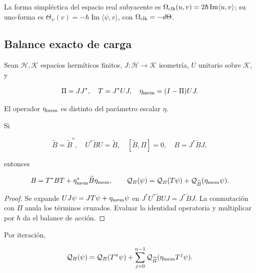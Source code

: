 La forma simpléctica del espacio real subyacente es
\(\Omega_{\rm clk}(u,v)=2\hbar\operatorname{Im}\langle u,v\rangle\);
su uno-forma es
\(\Theta_\psi(v)=-\hbar\operatorname{Im}\langle\psi,v\rangle\),
con \(\Omega_{\rm clk}=-d\Theta\).

\subsection{Balance exacto de carga}

Sean \(\mathcal H,\mathcal K\) espacios hermíticos finitos, \(J:\mathcal H\to\mathcal K\) isometría, \(U\) unitario sobre \(\mathcal K\), y

\begin{equation}
\Pi=JJ^*,\quad T=J^*UJ,\quad
\eta_{\rm mem}=(I-\Pi)UJ.
\label{x_reciprocidad:nuc07:eq:15}
\end{equation}

El operador \(\eta_{\rm mem}\) es distinto del parámetro escalar \(\eta\).

\begin{proposition}
Si

\begin{equation}
\widetilde B=\widetilde B^*,\quad U^*\widetilde BU=\widetilde B,
\quad [\widetilde B,\Pi]=0,\quad B=J^*\widetilde BJ,
\label{x_reciprocidad:nuc07:eq:16}
\end{equation}

entonces

\begin{equation}
B=T^*BT+\eta_{\rm mem}^*\widetilde B\eta_{\rm mem},
\qquad
\mathcal Q_B(\psi)=
\mathcal Q_B(T\psi)+\mathcal Q_{\widetilde B}(\eta_{\rm mem}\psi).
\label{x_reciprocidad:nuc07:eq:17}
\end{equation}
\end{proposition}

\begin{proof}
Se expande \(UJ\psi=JT\psi+\eta_{\rm mem}\psi\) en
\(J^*U^*\widetilde BUJ=J^*\widetilde BJ\).
La conmutación con \(\Pi\) anula los términos cruzados. Evaluar la identidad operatoria y multiplicar por \(\hbar\) da el balance de acción.
\end{proof}

Por iteración,

\begin{equation}
\mathcal Q_B(\psi)=\mathcal Q_B(T^n\psi)
+\sum_{j=0}^{n-1}\mathcal Q_{\widetilde B}
(\eta_{\rm mem}T^j\psi).
\label{x_reciprocidad:nuc07:eq:18}
\end{equation}

